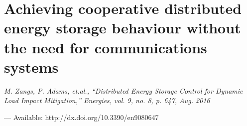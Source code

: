 \chapter{Achieving cooperative distributed energy storage behaviour without the need for communications systems}
\label{ch2:on-line-battery-operation-optimisation}

\singlespacing
\epigraph{\textit{M. Zangs, P. Adams, et.al., ``Distributed Energy Storage Control for Dynamic Load Impact Mitigation,'' Energies, vol. 9, no. 8, p. 647, Aug. 2016}}{--- Available: http://dx.doi.org/10.3390/en9080647}
\doublespacing



